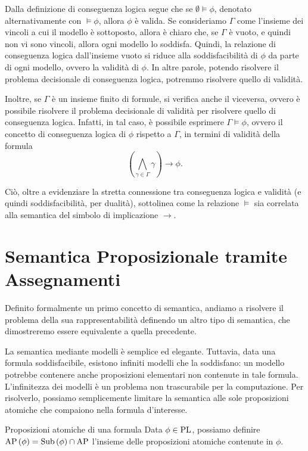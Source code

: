 Dalla definizione di conseguenza logica segue che se \(\emptyset \models \phi\), denotato alternativamente con \(\models \phi\), allora \(\phi\) è valida.
Se consideriamo \(\Gamma\) come l'insieme dei vincoli a cui il modello è sottoposto, allora è chiaro che, se \(\Gamma\) è vuoto, e quindi non vi sono vincoli, allora ogni modello lo soddisfa.
Quindi, la relazione di conseguenza logica dall'insieme vuoto si riduce alla soddisfacibilità di \(\phi\) da parte di ogni modello, ovvero la validità di \(\phi\).
In altre parole, potendo risolvere il problema decisionale di conseguenza logica, potremmo risolvere quello di validità.

Inoltre, se \(\Gamma\) è un insieme finito di formule, si verifica anche il viceversa, ovvero è possibile risolvere il problema decisionale di validità per risolvere quello di conseguenza logica. Infatti, in tal caso, è possibile esprimere \(\Gamma \models \phi\), ovvero il concetto di conseguenza logica di \(\phi\) rispetto a \(\Gamma\), in termini di validità della formula
\[\left(\bigwedge_{\gamma \in \Gamma} \gamma\right) \rightarrow \phi.\]

Ciò, oltre a evidenziare la stretta connessione tra conseguenza logica e validità (e quindi soddisfacibilità, per dualità), sottolinea come la relazione \(\models\) sia correlata alla semantica del simbolo di implicazione \(\rightarrow\).

\section{Semantica Proposizionale tramite Assegnamenti}

Definito formalmente un primo concetto di semantica, andiamo a risolvere il problema della sua rappresentabilità definendo un altro tipo di semantica, che dimostreremo essere equivalente a quella precedente.

La semantica mediante modelli è semplice ed elegante. 
Tuttavia, data una formula soddisfacibile, esistono infiniti modelli che la soddisfano: un modello potrebbe contenere anche proposizioni elementari non contenute in tale formula.
L'infinitezza dei modelli è un problema non trascurabile per la computazione.
Per risolverlo, possiamo semplicemente limitare la semantica alle sole proposizioni atomiche che compaiono nella formula d'interesse.

\begin{definition}{Proposizioni atomiche di una formula}
  Data \(\phi \in \operatorname{PL}\), possiamo definire \(\AP[\phi] = \Sub{\phi} \cap \AP\) l'insieme delle proposizioni atomiche contenute in \(\phi\).
\end{definition}

